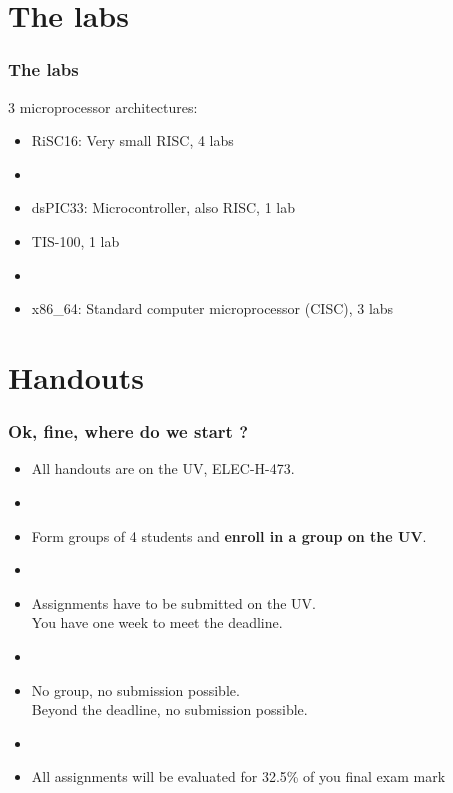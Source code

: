 \documentclass[11pt,a4paper,compress]{beamer}%
\begin{document}
\section{The labs}
\begin{frame}
\frametitle{The labs}

3 microprocessor architectures:
\begin{itemize}
\item RiSC16: Very small RISC, 4 labs
\item[]
\item dsPIC33: Microcontroller, also RISC, 1 lab
\item TIS-100, 1 lab
\item[]
\item x86\_64: Standard computer microprocessor (CISC), 3 labs
\end{itemize}
\end{frame}

\section{Handouts}
\begin{frame}
\frametitle{Ok, fine, where do we start ?}
\begin{itemize}
\item All handouts are on the UV, ELEC-H-473.
\item[]
\item Form groups of 4 students and \textbf{enroll in a group on the UV}.
\item[]
\item Assignments have to be submitted on the UV.\\ You have one week to meet the deadline.
\item[]
\item No group, no submission possible.\\Beyond the deadline, no submission possible.
\item[]
\item All assignments will be evaluated for 32.5\% of you final exam mark
\end{itemize}



\end{frame}
\end{document}
